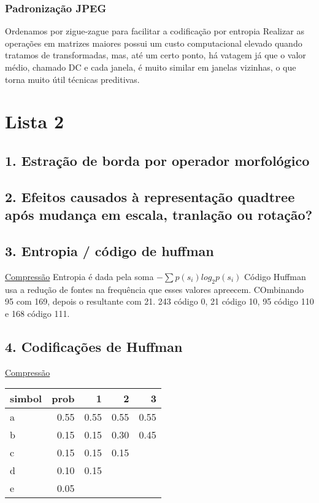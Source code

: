 \documentclass[twocolumn, 9pt]{article}
\begin{document}
\subsubsection*{Padronização JPEG}
\label{sec:orgd86546f}
Ordenamos por zigue-zague para facilitar a codificação por entropia
Realizar as operações em matrizes maiores possui um custo computacional elevado quando tratamos de transformadas, mas, até um certo ponto, há vatagem já que o valor médio, chamado DC e cada janela, é muito similar em janelas vizinhas, o que torna muito útil técnicas preditivas.
\section*{Lista 2}
\label{sec:org503b4ec}
\subsection*{1. Estração de borda por operador morfológico}
\label{sec:org973b690}
\subsection*{2. Efeitos causados à representação quadtree após mudança em escala, tranlação ou rotação?}
\label{sec:org5262679}
\subsection*{3. Entropia / código de huffman}
\label{sec:org14e5cff}
\hyperref[sec:orge460ab4]{Compressão}
Entropia é dada pela soma \(- \sum p(s_i) log_2 p(s_i)\)
Código Huffman usa a redução de fontes na frequência que esses valores apreecem. COmbinando 95 com 169, depois o resultante com 21. 243 código 0, 21 código 10, 95 código 110 e 168 código 111.
\subsection*{4. Codificações de Huffman}
\label{sec:orgcf6358c}
\hyperref[sec:orge460ab4]{Compressão}
\begin{center}
\begin{tabular}{lrrrr}
simbol & prob & 1 & 2 & 3\\[0pt]
\hline
a & 0.55 & 0.55 & 0.55 & 0.55\\[0pt]
b & 0.15 & 0.15 & 0.30 & 0.45\\[0pt]
c & 0.15 & 0.15 & 0.15 & \\[0pt]
d & 0.10 & 0.15 &  & \\[0pt]
e & 0.05 &  &  & \\[0pt]
\end{tabular}
\end{center}
\end{document}
